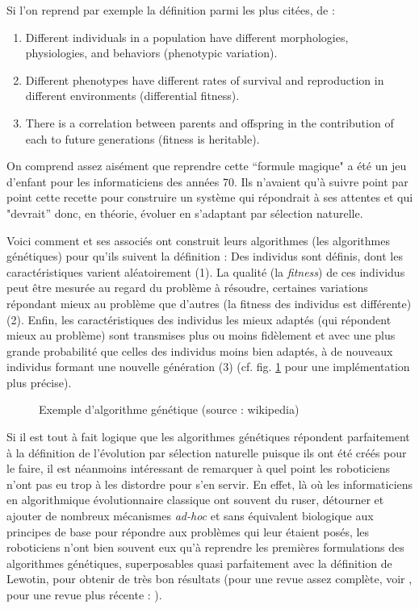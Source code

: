 
Si l'on reprend par exemple la définition parmi les plus citées, de \citet{lewontin70unitsselection} :
\begin{enumerate}
\item Different individuals in a population have different morphologies, physiologies, and behaviors (phenotypic variation).
\item Different phenotypes have different rates of survival and reproduction in different environments (differential fitness).
\item There is a correlation between parents and offspring in the contribution of each to future generations (fitness is heritable).
\end{enumerate}
On comprend assez aisément que reprendre cette ``formule magique" a été un jeu d'enfant pour les informaticiens des années 70. Ils n'avaient qu'à suivre point par point cette recette pour construire un système qui répondrait à ses attentes et qui "devrait'' donc, en théorie, évoluer en s'adaptant par sélection naturelle.

Voici comment \citet{holland75adaptationnaturalartificialsystem} et ses associés ont construit leurs algorithmes (les algorithmes génétiques) pour qu'ils suivent la définition : Des individus sont définis, dont les caractéristiques varient aléatoirement (1). La qualité (la \emph{fitness}) de ces individus peut être mesurée au regard du problème à résoudre, certaines variations répondant mieux au problème que d'autres (la fitness des individus est différente) (2). Enfin, les caractéristiques des individus les mieux adaptés (qui répondent mieux au problème) sont transmises plus ou moins fidèlement et avec une plus grande probabilité que celles des individus moins bien adaptés, à de nouveaux individus formant une nouvelle génération (3) (cf. fig. \ref{fig:AG} pour une implémentation plus précise).

	\begin{figure}
		\centering
		\caption{Exemple d'algorithme génétique (source : wikipedia)}\label{fig:AG}
	\end{figure}


Si il est tout à fait logique que les algorithmes génétiques répondent parfaitement à la définition de l'évolution par sélection naturelle puisque ils ont été créés pour le faire, il est néanmoins intéressant de remarquer à quel point les roboticiens n'ont pas eu trop à les distordre pour s'en servir.
En effet, là où les informaticiens en algorithmique évolutionnaire classique ont souvent du ruser, détourner et ajouter de nombreux mécanismes \emph{ad-hoc} et sans équivalent biologique aux principes de base pour répondre aux problèmes qui leur étaient posés, les roboticiens n'ont bien souvent eux qu'à reprendre les premières formulations des algorithmes génétiques, superposables quasi parfaitement avec la définition de Lewotin, pour obtenir de très bon résultats (pour une revue assez complète, voir \citet{nolfi00evolrobobiolintetechselfmach}, pour une revue plus récente : \citet{floreano10evolutionadaptivebehaviourrobotsbymeansdarwinianselection}).

